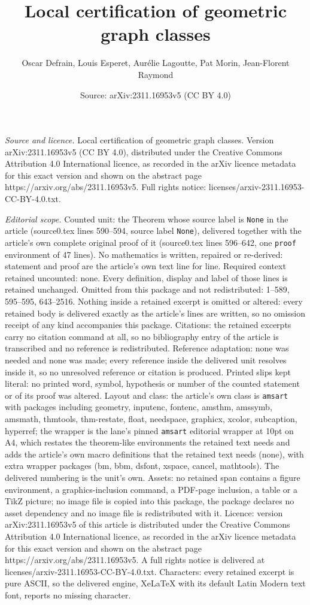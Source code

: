 \documentclass[10pt,a4paper]{amsart}
\title[Local certification of geometric graph classes]{Local certification of geometric graph classes}
\author{Oscar Defrain, Louis Esperet, Aur\'elie Lagoutte, Pat Morin, Jean-Florent Raymond}
\date{Source: arXiv:2311.16953v5 (CC BY 4.0)}
\begin{document}
\maketitle

\noindent\emph{Source and licence.} Local certification of geometric graph classes. Version arXiv:2311.16953v5 (CC BY 4.0), distributed under the Creative Commons Attribution 4.0 International licence, as recorded in the arXiv licence metadata for this exact version and shown on the abstract page https://arxiv.org/abs/2311.16953v5. Full rights notice: licenses/arxiv-2311.16953-CC-BY-4.0.txt.\par\smallskip

\noindent\textit{Editorial scope.} Counted unit: the Theorem whose source label is \texttt{None} in the article (source0.tex lines 590--594, source label \texttt{None}), delivered together with the article's own complete original proof of it (source0.tex lines 596--642, one \texttt{proof} environment of 47 lines). No mathematics is written, repaired or re-derived: statement and proof are the article's own text line for line. Required context retained uncounted: none. Every definition, display and label of those lines is retained unchanged. Omitted from this package and not redistributed: 1--589, 595--595, 643--2516. Nothing inside a retained excerpt is omitted or altered: every retained body is delivered exactly as the article's lines are written, so no omission receipt of any kind accompanies this package. Citations: the retained excerpts carry no citation command at all, so no bibliography entry of the article is transcribed and no reference is redistributed. Reference adaptation: none was needed and none was made; every reference inside the delivered unit resolves inside it, so no unresolved reference or citation is produced. Printed slips kept literal: no printed word, symbol, hypothesis or number of the counted statement or of its proof was altered. Layout and class: the article's own class is \texttt{amsart} with packages including geometry, inputenc, fontenc, amsthm, amssymb, amsmath, thmtools, thm-restate, float, needspace, graphicx, xcolor, subcaption, hyperref; the wrapper is the lane's pinned \texttt{amsart} editorial wrapper at 10pt on A4, which restates the theorem-like environments the retained text needs and adds the article's own macro definitions that the retained text needs (none), with extra wrapper packages (bm, bbm, dsfont, xspace, cancel, mathtools). The delivered numbering is the unit's own. Assets: no retained span contains a figure environment, a graphics-inclusion command, a PDF-page inclusion, a table or a TikZ picture; no image file is copied into this package, the package declares no asset dependency and no image file is redistributed with it. Licence: version arXiv:2311.16953v5 of this article is distributed under the Creative Commons Attribution 4.0 International licence, as recorded in the arXiv licence metadata for this exact version and shown on the abstract page https://arxiv.org/abs/2311.16953v5. A full rights notice is delivered at licenses/arxiv-2311.16953-CC-BY-4.0.txt. Characters: every retained excerpt is pure ASCII, so the delivered engine, XeLaTeX with its default Latin Modern text font, reports no missing character.
\end{document}

